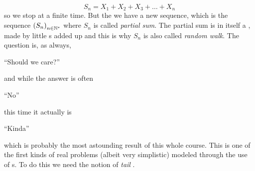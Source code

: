 \documentclass{report}
\begin{document}
\[S_n=X_1+X_2+X_3+\ldots+X_n\]
so we stop at a finite time. But the we have a new sequence, which is the sequence ${(S_n)}_{n\in\mathbb{N}^*}$ where $S_n$ is called \textit{partial sum}. The partial sum is in itself a \rv{}, made by little \rv s added up and this is why $S_n$ is also called \emph{random walk}. The question is, as always,
\begin{center}
	``Should we care?''
\end{center}
and while the answer is often
\begin{center}
	``No''
\end{center}
this time it actually is 
\begin{center}
	``Kinda''
\end{center}
which is probably the most astounding result of this whole course. This is one of the first kinds of real problems (albeit very simplistic) modeled through the use of \rv s. To do this we need the notion of \textit{tail \sa}.
\end{document}
